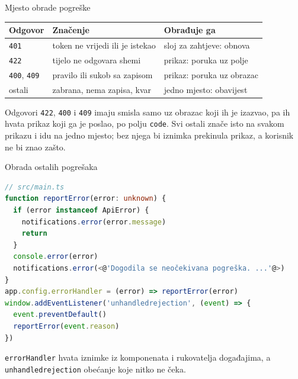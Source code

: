 \begin{frame}{Mjesto obrade pogreške}
\vspace{0.3em}
\begin{center}
{\small
\setlength{\tabcolsep}{6pt}
\renewcommand{\arraystretch}{1.3}
\begin{tabular}{@{}L{2.2cm}L{4.4cm}L{4.6cm}@{}}
  \toprule
  \textbf{Odgovor} & \textbf{Značenje} & \textbf{Obrađuje ga} \\
  \midrule
  \texttt{401} & token ne vrijedi ili je istekao & sloj za zahtjeve: obnova \\
  \texttt{422} & tijelo ne odgovara shemi & prikaz: poruka uz polje \\
  \texttt{400}, \texttt{409} & pravilo ili sukob sa zapisom & prikaz: poruka uz obrazac \\
  ostali & zabrana, nema zapisa, kvar & jedno mjesto: obavijest \\
  \bottomrule
\end{tabular}
}
\end{center}

\vspace{0.6em}
Odgovori \texttt{422}, \texttt{400} i \texttt{409} imaju smisla samo uz obrazac koji ih je izazvao, pa ih hvata prikaz koji ga je poslao, po polju \texttt{code}. Svi ostali znače isto na svakom prikazu i idu na jedno mjesto; bez njega bi iznimka prekinula prikaz, a korisnik ne bi znao zašto.
\end{frame}

\begin{frame}[fragile]{Obrada ostalih pogrešaka}
\begin{lstlisting}[language=typescript]
// src/main.ts
function reportError(error: unknown) {
  if (error instanceof ApiError) {
    notifications.error(error.message)
    return
  }
  console.error(error)
  notifications.error(<@'Dogodila se neočekivana pogreška. ...'@>)
}
app.config.errorHandler = (error) => reportError(error)
window.addEventListener('unhandledrejection', (event) => {
  event.preventDefault()
  reportError(event.reason)
})
\end{lstlisting}

\vspace{0.1em}
\texttt{errorHandler} hvata iznimke iz komponenata i rukovatelja događajima, a \texttt{unhandledrejection} obećanje koje nitko ne čeka.
\end{frame}

